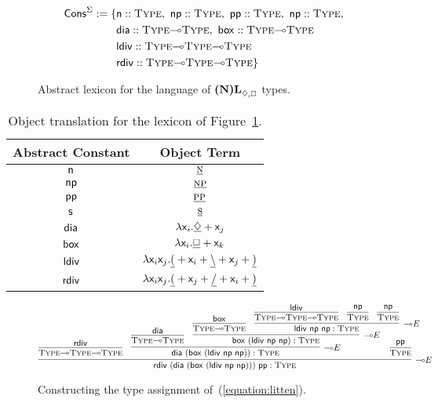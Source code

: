 \begin{figure}
	\begin{align*}
	\cons^{\Sigma} := \{ 
		& 	\smallterm{n} :: \type[s],\ \smallterm{np} :: \type[s],\ \smallterm{pp} :: \type[s],\ \smallterm{np} :: \type[s],\\
		&	\smallterm{dia} :: \type[s]\li\type[s],\ \smallterm{box} :: \type[s]\li\type[s]\\
		&	\smallterm{ldiv} :: \type[s]\li\type[s]\li\type[s] \\
		&	\smallterm{rdiv} :: \type[s]\li\type[s]\li\type[s] \}
	\end{align*}
	\caption{Abstract lexicon for the language of $\logic{(N)L}_{\diamond, \Box}$ types.}
	\label{figure:acg_nl_abstract_lex}
\end{figure}

\begin{table}
	\centering
	\begin{tabularx}{0.75\textwidth}{@{}cc@{}}
		Abstract Constant							& Object Term\\
		\toprule
		$\mathsf{n}$								& $\underline{\normalfont\textsc{n}}$\\
		$\mathsf{np}$							& $\underline{\normalfont\textsc{np}}$\\
		$\mathsf{pp}$							& $\underline{\normalfont\textsc{pp}}$\\
		$\mathsf{s}$								& $\underline{\normalfont\textsc{s}}$\\
		$\mathsf{dia}$							& $\smallterm{\lam  \vari.\underline{\diamond} + \varj}$\\		
		$\mathsf{box}$							& $\smallterm{\lam  \vari.\underline{\Box} + \vark}$\\		
		$\mathsf{ldiv}$							& $\mathsf{\mathnormal{\lambda}  \mathsf{x}_{\mathnormal{i}}\mathsf{x}_{\mathnormal{j}}.\underline{(} + \mathsf{x}_{\mathnormal{i}} + \underline{\backslash} + \mathsf{x}_{\mathnormal{j}} + \underline{)}}$\\
		$\mathsf{rdiv}$							& $\mathsf{\mathnormal{\lambda}  \mathsf{x}_{\mathnormal{i}}\mathsf{x}_{\mathnormal{j}}.\underline{(} + \mathsf{x}_{\mathnormal{j}} + \underline{/} + \mathsf{x}_{\mathnormal{i}} + \underline{)}}$
	\end{tabularx}
	\caption{Object translation for the lexicon of Figure~\ref{figure:acg_nl_abstract_lex}.}
	\label{table:nl_tg_acg}
\end{table}

\begin{figure}
	{\smaller
	\[
		\infer[\li E]{\term{rdiv~(dia~(box~(ldiv~np~np)))~pp}:\type}{
			\infer{\type\li\type\li\type}{\term{rdiv}}
			&
			\infer[\li E]{\term{dia~(box~(ldiv~np~np))}: \type}{
				\infer{\type\li\type}{\term{dia}}
				&
				\infer[\li E]{\term{box~(ldiv~np~np)}: \type}{
					\infer{\type\li \type}{\term{box}}
					&
					\infer[\li E]{\term{ldiv~np~np}: \type}{
						\infer{\type \li \type \li \type}{\term{ldiv}}
						&
						\infer{\type}{\term{np}}
						&
						\infer{\type}{\term{np}}
					}					
				}
			}
			&
			\hspace{-45pt}
			\infer{\type}{\term{pp}}
		}
	\]
	}
	\caption{Constructing the type assignment of~(\ref{equation:litten}).}
	\label{figure:litten_acg_der}
\end{figure}

